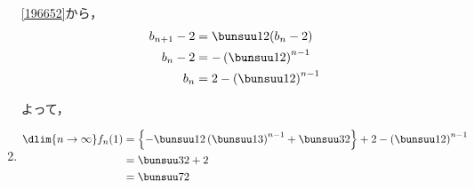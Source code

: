 \begin{enumerate}
\eqref{196652}から，
\begin{align*}
    b_{n+1} - 2 &= \bunsuu12 (b_n -2)\\
    b_n -2 &= -\left(\bunsuu12\right)^{n-1}\\
    b_n &= 2 - \left(\bunsuu12\right)^{n-1}
\end{align*}

よって，

\item
\begin{align*}
\dlim{n \to \infty} f_n(1) &= \left\{-\bunsuu12\left(\bunsuu13\right)^{n-1} + \bunsuu32\right\} + 2 - \left(\bunsuu12\right)^{n-1} \\
&=\bunsuu32 + 2\\
&=\bunsuu72
\end{align*}
\end{enumerate}
